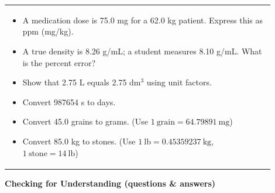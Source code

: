 \documentclass{article}
\begin{document}
\begin{tabular}{|p{0.9\linewidth}|}
\begin{itemize}
    \item A medication dose is 75.0 mg for a 62.0 kg patient. Express this as ppm (mg/kg).
    \item A true density is 8.26 g/mL; a student measures 8.10 g/mL. What is the percent error?
    \item Show that 2.75 L equals 2.75 dm$^3$ using unit factors.
    \item Convert 987654 s to days.
    \item Convert 45.0 grains to grams. (Use $1~\text{grain}=64.79891~\text{mg}$)
    \item Convert 85.0 kg to stones. (Use $1~\text{lb}=0.45359237~\text{kg}$, $1~\text{stone}=14~\text{lb}$)
\end{itemize}
\hline
\end{tabular}


\newpage
\noindent
{\large \textbf{Checking for Understanding (questions \& answers)}} \\[0.2em]
\end{document}
